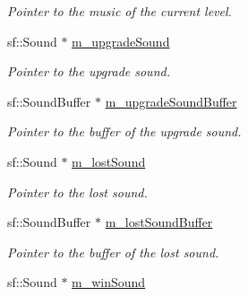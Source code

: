 \begin{DoxyCompactItemize}
\begin{DoxyCompactList}\small\item\em Pointer to the music of the current level. \end{DoxyCompactList}\item 
\hypertarget{class_game_manager_ad91a331f6af536db50fe1794c194871d}{sf\-::\-Sound $\ast$ \hyperlink{class_game_manager_ad91a331f6af536db50fe1794c194871d}{m\-\_\-upgrade\-Sound}}\label{class_game_manager_ad91a331f6af536db50fe1794c194871d}

\begin{DoxyCompactList}\small\item\em Pointer to the upgrade sound. \end{DoxyCompactList}\item 
\hypertarget{class_game_manager_a22fb2acccebe7dc6bd893a39ba747a38}{sf\-::\-Sound\-Buffer $\ast$ \hyperlink{class_game_manager_a22fb2acccebe7dc6bd893a39ba747a38}{m\-\_\-upgrade\-Sound\-Buffer}}\label{class_game_manager_a22fb2acccebe7dc6bd893a39ba747a38}

\begin{DoxyCompactList}\small\item\em Pointer to the buffer of the upgrade sound. \end{DoxyCompactList}\item 
\hypertarget{class_game_manager_a56334ff5fbd86615dfb9e03f2edc5248}{sf\-::\-Sound $\ast$ \hyperlink{class_game_manager_a56334ff5fbd86615dfb9e03f2edc5248}{m\-\_\-lost\-Sound}}\label{class_game_manager_a56334ff5fbd86615dfb9e03f2edc5248}

\begin{DoxyCompactList}\small\item\em Pointer to the lost sound. \end{DoxyCompactList}\item 
\hypertarget{class_game_manager_aad51c87666d9a388634cc3cd046114cc}{sf\-::\-Sound\-Buffer $\ast$ \hyperlink{class_game_manager_aad51c87666d9a388634cc3cd046114cc}{m\-\_\-lost\-Sound\-Buffer}}\label{class_game_manager_aad51c87666d9a388634cc3cd046114cc}

\begin{DoxyCompactList}\small\item\em Pointer to the buffer of the lost sound. \end{DoxyCompactList}\item 
\hypertarget{class_game_manager_a587e2e15b42ba0334bfaf344ad9429c7}{sf\-::\-Sound $\ast$ \hyperlink{class_game_manager_a587e2e15b42ba0334bfaf344ad9429c7}{m\-\_\-win\-Sound}}\label{class_game_manager_a587e2e15b42ba0334bfaf344ad9429c7}


\end{DoxyCompactItemize}
